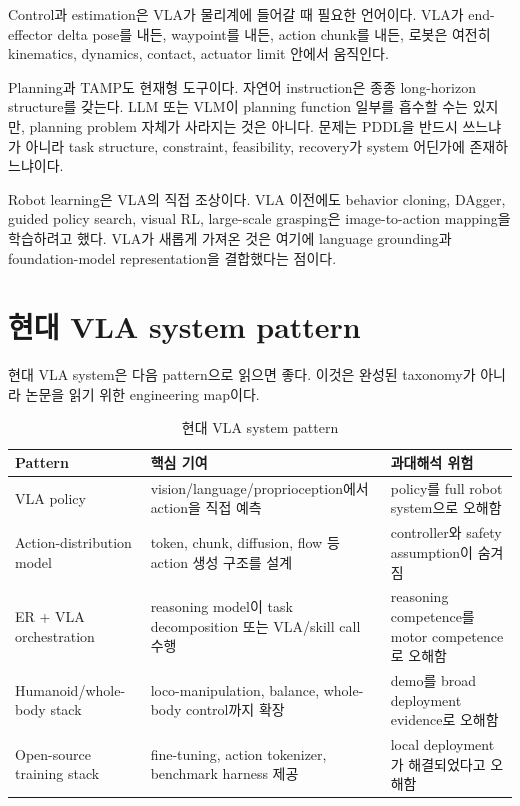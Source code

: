 Control과 estimation은 VLA가 물리계에 들어갈 때 필요한 언어이다. VLA가 end-effector delta pose를 내든, waypoint를 내든, action chunk를 내든, 로봇은 여전히 kinematics, dynamics, contact, actuator limit 안에서 움직인다.

Planning과 TAMP도 현재형 도구이다. 자연어 instruction은 종종 long-horizon structure를 갖는다. LLM 또는 VLM이 planning function 일부를 흡수할 수는 있지만, planning problem 자체가 사라지는 것은 아니다. 문제는 PDDL을 반드시 쓰느냐가 아니라 task structure, constraint, feasibility, recovery가 system 어딘가에 존재하느냐이다.

Robot learning은 VLA의 직접 조상이다. VLA 이전에도 behavior cloning, DAgger, guided policy search, visual RL, large-scale grasping은 image-to-action mapping을 학습하려고 했다. VLA가 새롭게 가져온 것은 여기에 language grounding과 foundation-model representation을 결합했다는 점이다.

\section{현대 VLA system pattern}

현대 VLA system은 다음 pattern으로 읽으면 좋다. 이것은 완성된 taxonomy가 아니라 논문을 읽기 위한 engineering map이다.

\begin{table}[ht]
\centering
\caption{현대 VLA system pattern}
\label{tab:patterns}
\small
\begin{tabularx}{\textwidth}{p{28mm}X X}
\toprule
Pattern & 핵심 기여 & 과대해석 위험 \\
\midrule
VLA policy & vision/language/proprioception에서 action을 직접 예측 & policy를 full robot system으로 오해함 \\
Action-distribution model & token, chunk, diffusion, flow 등 action 생성 구조를 설계 & controller와 safety assumption이 숨겨짐 \\
ER + VLA orchestration & reasoning model이 task decomposition 또는 VLA/skill call 수행 & reasoning competence를 motor competence로 오해함 \\
Humanoid/whole-body stack & loco-manipulation, balance, whole-body control까지 확장 & demo를 broad deployment evidence로 오해함 \\
Open-source training stack & fine-tuning, action tokenizer, benchmark harness 제공 & local deployment가 해결되었다고 오해함 \\
\bottomrule
\end{tabularx}
\end{table}

